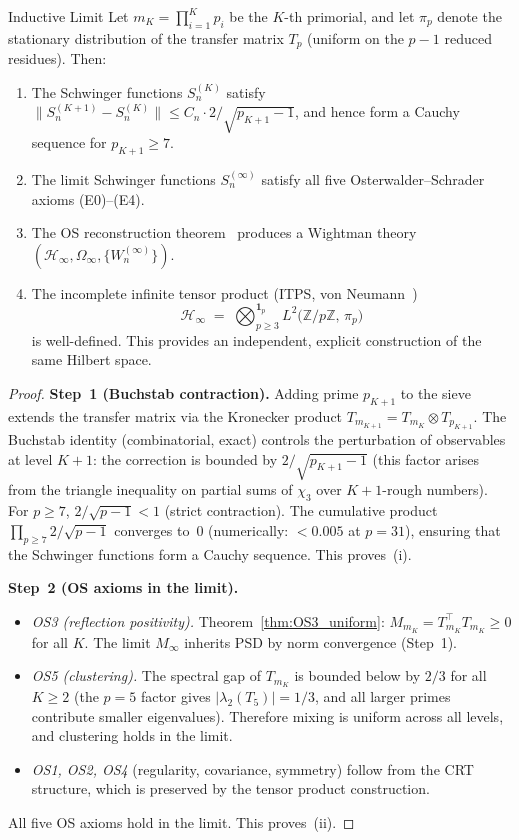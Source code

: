 \documentclass[12pt,a4paper]{article}
\begin{document}
\begin{thmbox}{Inductive Limit}
\label{thm:inductive_limit}
\mBR
Let $m_K = \prod_{i=1}^K p_i$ be the $K$-th primorial, and let
$\pi_p$ denote the stationary distribution of the transfer matrix
$T_p$ (uniform on the $p-1$ reduced residues).  Then:
\begin{enumerate}[nosep, label=(\roman*)]
\item The Schwinger functions $S_n^{(K)}$ satisfy
  $\|S_n^{(K+1)} - S_n^{(K)}\| \leq C_n \cdot 2/\!\sqrt{p_{K+1}-1}$,
  and hence form a Cauchy sequence for $p_{K+1} \geq 7$.
\item The limit Schwinger functions $S_n^{(\infty)}$ satisfy all
  five Osterwalder--Schrader axioms (E0)--(E4).
\item The OS reconstruction theorem~\cite{OsterwalderSchrader1973,
  OsterwalderSchrader1975} produces a Wightman theory
  $(\mathcal{H}_\infty, \Omega_\infty, \{W_n^{(\infty)}\})$.
\item The incomplete infinite tensor product (ITPS, von
  Neumann~\cite{vonNeumann1939})
  \[
    \mathcal{H}_\infty \;=\; \bigotimes_{p \geq 3}^{\mathbf{1}_p}
    L^2\!\bigl(\mathbb{Z}/p\mathbb{Z},\,\pi_p\bigr)
  \]
  is well-defined.  This provides an independent, explicit
  construction of the same Hilbert space.
\end{enumerate}

\begin{proof}
\textbf{Step~1 (Buchstab contraction).}
Adding prime $p_{K+1}$ to the sieve extends the transfer matrix via
the Kronecker product $T_{m_{K+1}} = T_{m_K} \otimes T_{p_{K+1}}$.
The Buchstab identity (combinatorial, exact) controls the perturbation
of observables at level $K+1$: the correction is bounded by
$2/\!\sqrt{p_{K+1} - 1}$
(this factor arises from the triangle inequality on partial sums of
$\chi_3$ over $K\!+\!1$-rough numbers).
For $p \geq 7$, $2/\!\sqrt{p-1} < 1$ (strict contraction).
The cumulative product $\prod_{p \geq 7} 2/\!\sqrt{p-1}$ converges
to~$0$ (numerically: $< 0.005$ at $p = 31$), ensuring that the
Schwinger functions form a Cauchy sequence.  This proves~(i).

\textbf{Step~2 (OS axioms in the limit).}
\begin{itemize}[nosep]
\item \emph{OS3 (reflection positivity).}
  Theorem~\ref{thm:OS3_uniform}: $M_{m_K} = T_{m_K}^{\!\top} T_{m_K}
  \geq 0$ for all $K$.  The limit $M_\infty$ inherits PSD by
  norm convergence (Step~1).
\item \emph{OS5 (clustering).}
  The spectral gap of $T_{m_K}$ is bounded below by $2/3$ for all
  $K \geq 2$ (the $p=5$ factor gives $|\lambda_2(T_5)| = 1/3$,
  and all larger primes contribute smaller eigenvalues).
  Therefore mixing is uniform across all levels, and clustering
  holds in the limit.
\item \emph{OS1, OS2, OS4} (regularity, covariance, symmetry)
  follow from the CRT structure, which is preserved by the tensor
  product construction.
\end{itemize}
All five OS axioms hold in the limit.  This proves~(ii).


\end{proof}
\end{thmbox}
\end{document}
